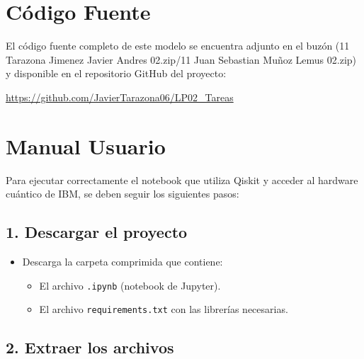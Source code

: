 \documentclass{article}
\begin{document}

\section{Código Fuente}\label{sec:cod}

El código fuente completo de este modelo se encuentra adjunto en el buzón 
(11 Tarazona Jimenez Javier Andres 02.zip/11 Juan Sebastian Muñoz Lemus 02.zip)
y disponible en el repositorio GitHub del proyecto:

\begin{center}
\url{https://github.com/JavierTarazona06/LP02_Tareas}
\end{center}


\section{Manual Usuario}\label{sec:man_u}

Para ejecutar correctamente el notebook que utiliza Qiskit y acceder al hardware cuántico de IBM, 
se deben seguir los siguientes pasos:

\subsection*{1. Descargar el proyecto}

\begin{itemize}
    \item Descarga la carpeta comprimida que contiene:
    \begin{itemize}
        \item El archivo \texttt{.ipynb} (notebook de Jupyter).
        \item El archivo \texttt{requirements.txt} con las librerías necesarias.
    \end{itemize}
\end{itemize}

\subsection*{2. Extraer los archivos}
\end{document}
